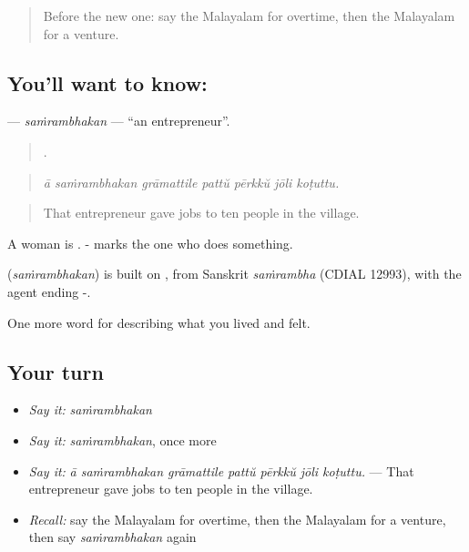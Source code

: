 \label{lesson:ML-C544-samrambhakan}



\begin{quote}
Before the new one: say the Malayalam for overtime, then the Malayalam for a venture.
\end{quote}

\subsection*{You'll want to know: }
\textbf{} — \emph{saṁrambhakan} — \textquotedblleft{}an entrepreneur\textquotedblright{}.

\begin{quote}
      .
\end{quote}

\begin{quote}
\emph{ā saṁrambhakan grāmattile pattŭ pērkkŭ jōli koṭuttu.}
\end{quote}

\begin{quote}
That entrepreneur gave jobs to ten people in the village.
\end{quote}

A woman is . - marks the one who does something.

\begin{cousinweb}
\textbf{} (\emph{saṁrambhakan}) is built on , from Sanskrit \emph{saṁrambha} (CDIAL 12993), with the agent ending -.
\end{cousinweb}

\begin{grammarlens}[title={What you've built}]
One more word for describing what you lived and felt.
\end{grammarlens}

\subsection*{Your turn}
\begin{itemize}
\raggedright
  \item \emph{Say it:} \emph{saṁrambhakan}
  \item \emph{Say it:} \emph{saṁrambhakan}, once more
  \item \emph{Say it:} \emph{ā saṁrambhakan grāmattile pattŭ pērkkŭ jōli koṭuttu.} — That entrepreneur gave jobs to ten people in the village.
  \item \emph{Recall:} say the Malayalam for overtime, then the Malayalam for a venture, then say \emph{saṁrambhakan} again
\end{itemize}

